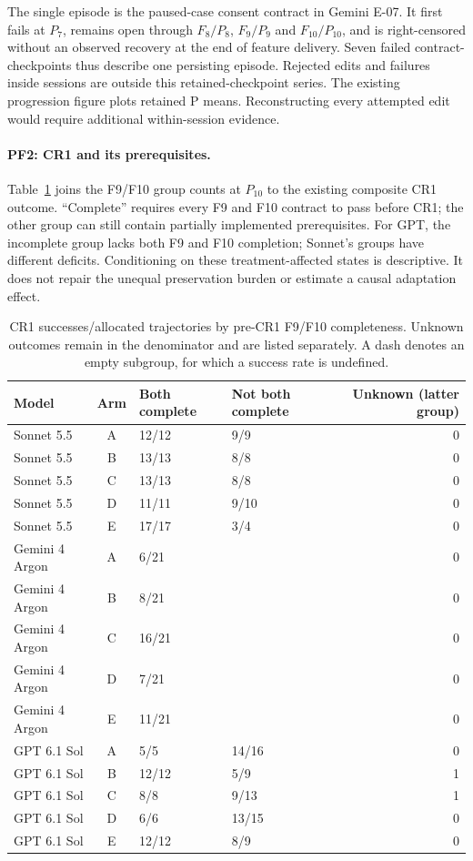 The single episode is the paused-case consent contract in Gemini E-07.
It first fails at $P_7$, remains open through $F_8/P_8$, $F_9/P_9$ and
$F_{10}/P_{10}$, and is right-censored without an observed recovery at
the end of feature delivery. Seven failed contract-checkpoints thus describe
one persisting episode. Rejected edits and failures inside sessions are
outside this retained-checkpoint series. The existing progression figure
plots retained P means. Reconstructing every attempted edit would require
additional within-session evidence.

\paragraph{PF2: CR1 and its prerequisites.}
Table~\ref{tab:crprerequisites} joins the F9/F10 group counts at $P_{10}$
to the existing composite CR1 outcome. ``Complete'' requires every F9
and F10 contract to pass before CR1; the other group can still contain
partially implemented prerequisites. For GPT, the incomplete group lacks
both F9 and F10 completion; Sonnet's groups have different deficits.
Conditioning on these treatment-affected states is descriptive.
It does not repair the unequal preservation burden or estimate a causal
adaptation effect.

\begin{table}[!htbp]
\centering\small
\caption{CR1 successes/allocated trajectories by pre-CR1 F9/F10
completeness. Unknown outcomes remain in the denominator and are listed
separately. A dash denotes an empty subgroup, for which a success rate
is undefined.}\label{tab:crprerequisites}

\begin{tabular*}{\textwidth}{@{\extracolsep{\fill}}lcllr@{}}
\toprule
Model & Arm & Both complete & Not both complete & Unknown (latter group) \\
\midrule
Sonnet 5.5 & A & 12/12 & 9/9 & 0 \\
Sonnet 5.5 & B & 13/13 & 8/8 & 0 \\
Sonnet 5.5 & C & 13/13 & 8/8 & 0 \\
Sonnet 5.5 & D & 11/11 & 9/10 & 0 \\
Sonnet 5.5 & E & 17/17 & 3/4 & 0 \\
\midrule
Gemini 4 Argon & A & 6/21 & \textendash{} & 0 \\
Gemini 4 Argon & B & 8/21 & \textendash{} & 0 \\
Gemini 4 Argon & C & 16/21 & \textendash{} & 0 \\
Gemini 4 Argon & D & 7/21 & \textendash{} & 0 \\
Gemini 4 Argon & E & 11/21 & \textendash{} & 0 \\
\midrule
GPT 6.1 Sol & A & 5/5 & 14/16 & 0 \\
GPT 6.1 Sol & B & 12/12 & 5/9 & 1 \\
GPT 6.1 Sol & C & 8/8 & 9/13 & 1 \\
GPT 6.1 Sol & D & 6/6 & 13/15 & 0 \\
GPT 6.1 Sol & E & 12/12 & 8/9 & 0 \\
\bottomrule
\end{tabular*}
\end{table}


